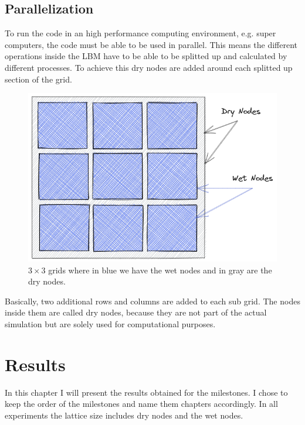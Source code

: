 \section{Parallelization}
To run the code in an high performance computing environment, e.g. super computers, the code must be able to be used in parallel.
This means the different operations inside the LBM have to be able to be splitted up and calculated by different processes. 
To achieve this dry nodes are added around each splitted up section of the grid.
\begin{figure}[ht]
\centering
\includegraphics[width=0.5\columnwidth]{milestones/final/img/latttice-ghost-beschriftet.png}
\caption[Wet and dry nodes]{$3\times3$ grids where in blue we have the wet nodes and in gray are the dry nodes.}
\label{fig:para-ghost}
\end{figure}
Basically, two additional rows and columns are added to each sub grid. 
The nodes inside them are called dry nodes, because they are not part of the actual simulation but are solely used for computational purposes.


\chapter{Results}
In this chapter I will present the results obtained for the milestones. I chose to keep the order of the milestones and name them chapters accordingly.
In all experiments the lattice size includes dry nodes and the wet nodes.

